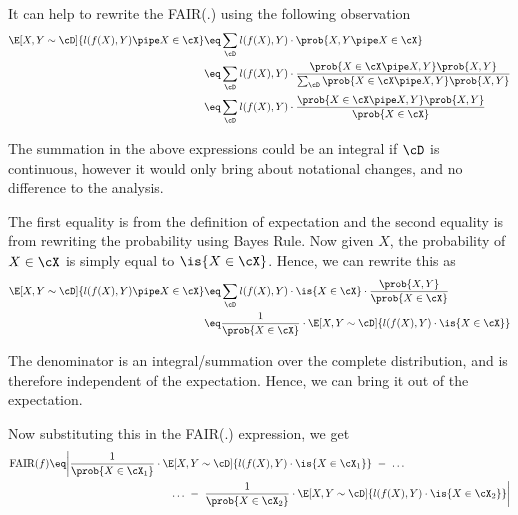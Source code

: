 \documentclass[a4paper,10pt]{article}
\begin{document}
\begin{question}

	\def\fair{\text{FAIR}(f)}
	\def\fairs{\overline{\text{FAIR}}(f, \cS)}
	\def\fairsn{\overline{\text{FAIR}}(f, \cS_n)}

	It can help to rewrite the FAIR(.) using the following observation
	\begin{align*}
		\E[X, Y \sim \cD]{l(f(X), Y) \pipe X \in \cX}	&\eq	\sum_{\cD} l(f(X), Y) \cdot \prob{X, Y \pipe X \in \cX} \\
		&\eq	\sum_{\cD} l(f(X), Y) \cdot \frac{\prob{X \in \cX \pipe X, Y} \prob{X, Y}}{\sum_{\cD} \prob{X \in \cX \pipe X, Y} \prob{X, Y}} \\
		&\eq	\sum_{\cD} l(f(X), Y) \cdot \frac{\prob{X \in \cX \pipe X, Y} \prob{X, Y}}{\prob{X \in \cX}}
	\end{align*}

	\begin{note}
		The summation in the above expressions could be an integral if $\cD$ is continuous, however it would only bring about notational changes, and no difference to the analysis.
	\end{note}

	The first equality is from the definition of expectation and the second equality is from rewriting the probability using Bayes Rule. Now given $X$, the probability of $X \in \cX$ is simply equal to $\is{X \in \cX}$. Hence, we can rewrite this as
	\begin{align*}
		\E[X, Y \sim \cD]{l(f(X), Y) \pipe X \in \cX}	&\eq	\sum_{\cD} l(f(X), Y) \cdot \is{X \in \cX} \cdot \frac{\prob{X, Y}}{\prob{X \in \cX}} \\
		&\eq	\frac{1}{\prob{X \in \cX}} \cdot \E[X, Y \sim \cD]{l(f(X), Y) \cdot \is{X \in \cX}}
	\end{align*}

	\begin{note}
		The denominator is an integral/summation over the complete distribution, and is therefore independent of the expectation. Hence, we can bring it out of the expectation.
	\end{note}

	Now substituting this in the FAIR(.) expression, we get
	\begin{align*}
		\fair	&\eq	\bigg| \frac{1}{\prob{X \in \cX_1}} \cdot \E[X, Y \sim \cD]{l(f(X), Y) \cdot \is{X \in \cX_1}}\ -\ \dots \\
		& \hspace{4cm} \dots\ -\ \frac{1}{\prob{X \in \cX_2}} \cdot \E[X, Y \sim \cD]{l(f(X), Y) \cdot \is{X \in \cX_2}} \bigg|
	\end{align*}


\end{question}
\end{document}
